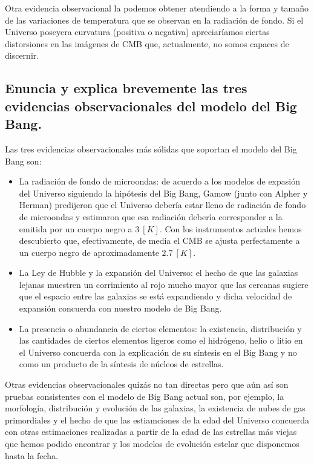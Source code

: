 \documentclass{tufte-handout}
\begin{document}
Otra evidencia observacional la podemos obtener atendiendo a la forma y tamaño de las variaciones de temperatura que se observan en la radiación de fondo. Si el Universo poseyera curvatura (positiva o negativa) apreciaríamos ciertas distorsiones en las imágenes de CMB que, actualmente, no somos capaces de discernir.

\clearpage

\subsection{\textbf{Enuncia y explica brevemente las tres evidencias observacionales del modelo del Big Bang.}}

Las tres evidencias observacionales más sólidas que soportan el modelo del Big Bang son:

\begin{itemize}
  \item La radiación de fondo de microondas: de acuerdo a los modelos de expasión del Universo siguiendo la hipótesis del Big Bang, Gamow (junto con Alpher y Herman) predijeron que el Universo debería estar lleno de radiación de fondo de microondas y estimaron que esa radiación debería corresponder a la emitida por un cuerpo negro a $3~[K]$. Con los instrumentos actuales hemos descubierto que, efectivamente, de media el CMB se ajusta perfectamente a un cuerpo negro de aproximadamente $2.7~[K]$. 
  \item La Ley de Hubble y la expansión del Universo: el hecho de que las galaxias lejanas muestren un corrimiento al rojo mucho mayor que las cercanas sugiere que el espacio entre las galaxias se está expandiendo y dicha velocidad de expansión concuerda con nuestro modelo de Big Bang.
  \item La presencia o abundancia de ciertos elementos: la existencia, distribución y las cantidades de ciertos elementos ligeros como el hidrógeno, helio o litio en el Universo concuerda con la explicación de su síntesis en el Big Bang y no como un producto de la síntesis de núcleos de estrellas.
\end{itemize}

Otras evidencias observacionales quizás no tan directas pero que aún así son pruebas consistentes con el modelo de Big Bang actual son, por ejemplo, la morfología, distribución y evolución de las galaxias, la existencia de nubes de gas primordiales y el hecho de que las estiamciones de la edad del Universo concuerda con otras estimaciones realizadas a partir de la edad de las estrellas más viejas que hemos podido encontrar y los modelos de evolución estelar que disponemos hasta la fecha. 



\end{document}
